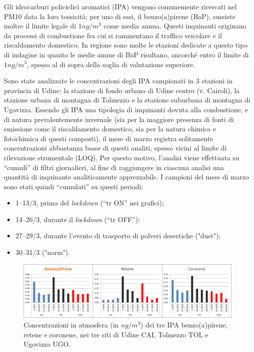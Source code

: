 Gli idrocarburi policiclici aromatici (IPA) vengono comunemente ricercati nel PM10 data la loro tossicità; per uno di essi, il benzo(a)pirene (BaP), sussiste inoltre il limite legale di $1 ng/m^3$ come media annua. Questi inquinanti originano da processi di combustione fra cui si rammentano il traffico veicolare e il riscaldamento domestico. In regione sono molte le stazioni dedicate a questo tipo di indagine in quanto le medie annue di BaP risultano, ancorché entro il limite di $1 ng/m^3$, spesso al di sopra della soglia di valutazione superiore.

Sono state analizzate le concentrazioni degli IPA campionati in 3 stazioni in provincia di Udine: la stazione di fondo urbano di Udine centro (v. Cairoli), la stazione urbana di montagna di Tolmezzo e la stazione suburbana di montagna di Ugovizza. Essendo gli IPA una tipologia di inquinanti dovuta alla combustione, e di natura prevalentemente invernale (sia per la maggiore presenza di fonti di emissione come il riscaldamento domestico, sia per la natura chimica e fotochimica di questi composti), il mese di marzo registra solitamente concentrazioni abbastanza basse di questi analiti, spesso vicini al limite di rilevazione strumentale (LOQ). Per questo motivo, l’analisi viene effettuata su “cumuli” di filtri giornalieri, al fine di raggiungere in ciascuna analisi una quantità di inquinante analiticamente apprezzabile. I campioni del mese di marzo sono stati quindi “cumulati” su questi periodi: 
\begin{itemize}
    \item 1--13/3, prima del \textit{lockdown} (“tr ON” nei grafici);
    \item 14--26/3, durante il \textit{lockdown} (“tr OFF”);
    \item 27--29/3, durante l'evento di trasporto di polveri desertiche ("dust");
    \item 30--31/3 ("norm").
\end{itemize}

\begin{figure}
    \centering
    \includegraphics[width=\textwidth]{figs/ipa-barre.png}
    \caption[Concentrazioni in atmosfera di BaP, retene e coronene]{Concentrazioni in atmosfera (in $ng/m^3$) dei tre IPA benzo(a)pirene, retene e coronene, nei tre siti di Udine CAI, Tolmezzo TOL e Ugovizza UGO.}
    \label{fig:ipa2}
\end{figure}

